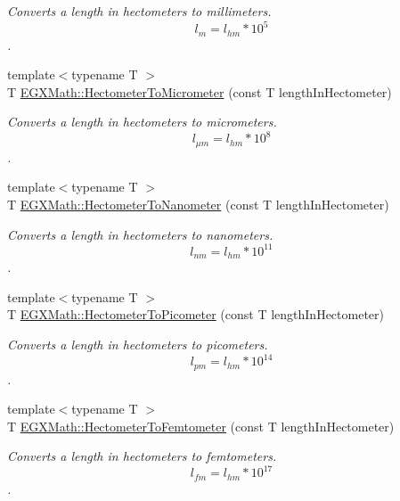 \begin{DoxyCompactItemize}
\begin{DoxyCompactList}\small\item\em Converts a length in hectometers to millimeters. \[ l_{m}=l_{hm} * 10^{5} \]. \end{DoxyCompactList}\item 
{\footnotesize template$<$typename T $>$ }\\T \mbox{\hyperlink{group___e_g_x_math-_conversions-_length_conversions-_hectometer-_s_i_ga3f5229b11d79e20007ac9320a317272a}{E\+G\+X\+Math\+::\+Hectometer\+To\+Micrometer}} (const T length\+In\+Hectometer)
\begin{DoxyCompactList}\small\item\em Converts a length in hectometers to micrometers. \[ l_{\mu m}=l_{hm} * 10^{8} \]. \end{DoxyCompactList}\item 
{\footnotesize template$<$typename T $>$ }\\T \mbox{\hyperlink{group___e_g_x_math-_conversions-_length_conversions-_hectometer-_s_i_gac9e19002288731e06d492cc5f8ee0a0e}{E\+G\+X\+Math\+::\+Hectometer\+To\+Nanometer}} (const T length\+In\+Hectometer)
\begin{DoxyCompactList}\small\item\em Converts a length in hectometers to nanometers. \[ l_{nm}=l_{hm} * 10^{11} \]. \end{DoxyCompactList}\item 
{\footnotesize template$<$typename T $>$ }\\T \mbox{\hyperlink{group___e_g_x_math-_conversions-_length_conversions-_hectometer-_s_i_gaa45a09cd750ee4e48680332f0ce39f07}{E\+G\+X\+Math\+::\+Hectometer\+To\+Picometer}} (const T length\+In\+Hectometer)
\begin{DoxyCompactList}\small\item\em Converts a length in hectometers to picometers. \[ l_{pm}=l_{hm} * 10^{14} \]. \end{DoxyCompactList}\item 
{\footnotesize template$<$typename T $>$ }\\T \mbox{\hyperlink{group___e_g_x_math-_conversions-_length_conversions-_hectometer-_s_i_gac1a1dfa64b70f5495ef5ea5c85b17677}{E\+G\+X\+Math\+::\+Hectometer\+To\+Femtometer}} (const T length\+In\+Hectometer)
\begin{DoxyCompactList}\small\item\em Converts a length in hectometers to femtometers. \[ l_{fm}=l_{hm} * 10^{17} \]. \end{DoxyCompactList}\item 

\end{DoxyCompactItemize}
